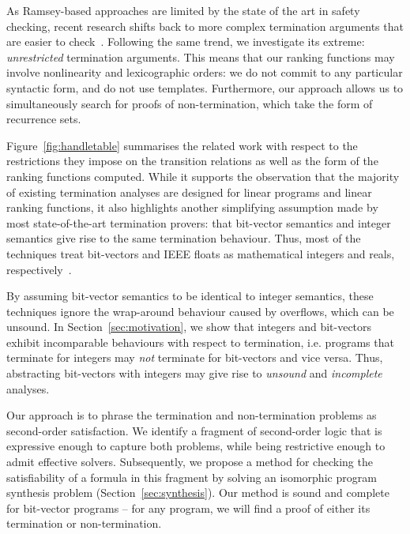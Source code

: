 \documentclass[preprint]{sigplanconf}
\theoremstyle{definition}
\begin{document}
As Ramsey-based approaches are limited by the state of the art in safety
checking, recent research shifts back to more complex termination arguments
that are easier to
check~\cite{DBLP:conf/cav/KroeningSTW10,DBLP:conf/tacas/CookSZ13}. 
Following the same trend, we investigate its extreme: \emph{unrestricted}
termination arguments.  This means that our ranking functions may involve
nonlinearity and lexicographic orders: we do not commit to any particular
syntactic form, and do not use templates.  Furthermore, our approach allows
us to simultaneously search for proofs of non-termination, which take the form
of recurrence sets.

Figure~\ref{fig:handletable} summarises the related work with respect to the
restrictions they impose on the transition relations as well as the form of
the ranking functions computed.  While it supports the observation that the
majority of existing termination analyses are designed for linear programs
and linear ranking functions, it also highlights another simplifying
assumption made by most state-of-the-art termination provers: that
bit-vector semantics and integer semantics give rise to the same termination
behaviour.  Thus, most of the techniques treat bit-vectors and IEEE floats
as mathematical integers and reals,
respectively~\cite{DBLP:conf/pldi/CookPR06,DBLP:conf/popl/Ben-AmramG13,DBLP:conf/vmcai/P04,DBLP:conf/atva/HeizmannHLP13,DBLP:conf/vmcai/BradleyMS05,DBLP:conf/cav/KroeningSTW10}.

By assuming bit-vector semantics to be identical to integer semantics, these
techniques ignore the wrap-around behaviour caused by overflows, which can
be unsound.  In Section~\ref{sec:motivation}, we show that integers and
bit-vectors exhibit incomparable behaviours with respect to termination,
i.e.  programs that terminate for integers may \emph{not} terminate for
bit-vectors and vice versa.  Thus, abstracting bit-vectors with integers may
give rise to {\em unsound} and {\em incomplete} analyses.



Our approach is to phrase the termination and non-termination problems as
second-order satisfaction.  We identify a fragment of second-order
logic that is expressive enough to capture both problems, while being
restrictive enough to admit effective solvers.  Subsequently, we propose a method for
checking the satisfiability of a formula in this fragment by
solving an isomorphic program synthesis problem
(Section~\ref{sec:synthesis}).  Our method is sound and
complete for bit-vector programs -- for any program, we will find
a proof of either its termination or non-termination.
\end{document}
